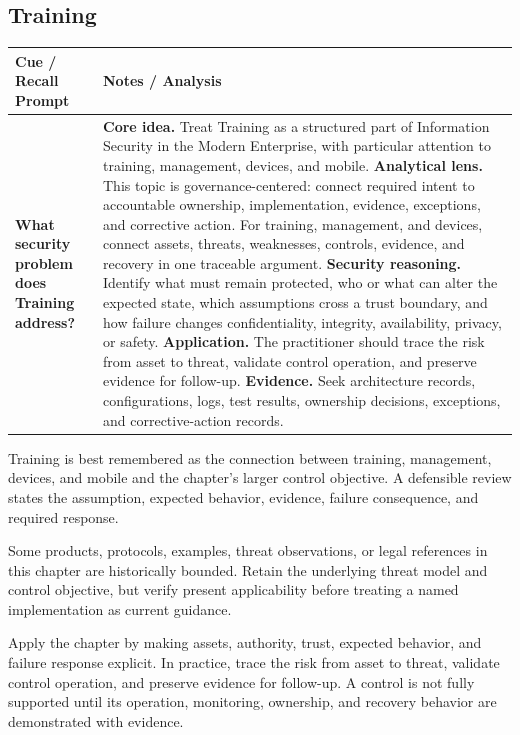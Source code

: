 \documentclass[11pt]{article}
\newcommand{\CornellHeader}{%
\rowcolor{Navy}\color{white}\bfseries Cue / Recall Prompt & \color{white}\bfseries Notes / Analysis\\\hline}
\newcommand{\CornellRow}[2]{%
\cellcolor{CueGray}\RaggedRight\textbf{#1} & \RaggedRight #2\\\hline}
\begin{document}
\subsection*{Training}
\begin{longtable}{>{\RaggedRight\arraybackslash}p{}|>{\RaggedRight\arraybackslash}p{}}
\CornellHeader
\CornellRow{What security problem does Training address?}{\textbf{Core idea.} Treat Training as a structured part of Information Security in the Modern Enterprise, with particular attention to training, management, devices, and mobile. \textbf{Analytical lens.} This topic is governance-centered: connect required intent to accountable ownership, implementation, evidence, exceptions, and corrective action. For training, management, and devices, connect assets, threats, weaknesses, controls, evidence, and recovery in one traceable argument. \textbf{Security reasoning.} Identify what must remain protected, who or what can alter the expected state, which assumptions cross a trust boundary, and how failure changes confidentiality, integrity, availability, privacy, or safety. \textbf{Application.} The practitioner should trace the risk from asset to threat, validate control operation, and preserve evidence for follow-up. \textbf{Evidence.} Seek architecture records, configurations, logs, test results, ownership decisions, exceptions, and corrective-action records.}
\end{longtable}
\begin{topicsummary}
Training is best remembered as the connection between training, management, devices, and mobile and the chapter's larger control objective. A defensible review states the assumption, expected behavior, evidence, failure consequence, and required response.
\end{topicsummary}
\begin{historybox}
Some products, protocols, examples, threat observations, or legal references in this chapter are historically bounded. Retain the underlying threat model and control objective, but verify present applicability before treating a named implementation as current guidance.
\end{historybox}
\begin{defensebox}
Apply the chapter by making assets, authority, trust, expected behavior, and failure response explicit. In practice, trace the risk from asset to threat, validate control operation, and preserve evidence for follow-up. A control is not fully supported until its operation, monitoring, ownership, and recovery behavior are demonstrated with evidence.
\end{defensebox}
\end{document}
